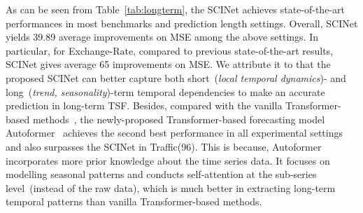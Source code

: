 \documentclass{article}
\begin{document}
As can be seen from Table~\ref{tab:longterm}, the SCINet achieves state-of-the-art performances in most benchmarks and prediction length settings. Overall, SCINet yields 39.89 average improvements on MSE among the above settings. In particular, for Exchange-Rate, compared to previous state-of-the-art results, SCINet gives average 65 improvements on MSE. We attribute it to that the proposed SCINet can better capture both short~(\emph{local temporal dynamics})- and long~(\emph{trend, seasonality})-term temporal dependencies to make an accurate prediction in long-term TSF. Besides, compared with the vanilla Transformer-based methods~\citep{kitaev2019reformer,li2019enhancing,Zhou2020InformerBE}, the newly-proposed Transformer-based forecasting model Autoformer~\citep{Wu2021AutoformerDT} achieves the second best performance in all experimental settings and also surpasses the SCINet in Traffic(96). This is because, Autoformer incorporates more prior knowledge about the time series data. It focuses on modelling seasonal patterns and conducts self-attention at the sub-series level~(instead of the raw data), which is much better in extracting long-term temporal patterns than vanilla Transformer-based methods.
\end{document}
